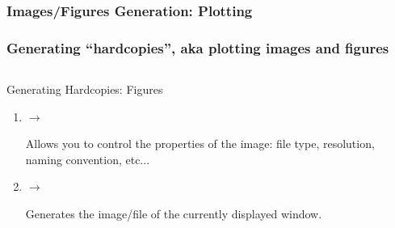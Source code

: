 \subsubsection{Images/Figures Generation: Plotting}
\begin{frame}
\frametitle{Generating ``hardcopies'', aka plotting images and figures}
\vspace{-2.5mm}
\begin{columns}
\begin{column}{5.75cm}
        \begin{block}{Generating Hardcopies: Figures}
        \begin{enumerate}

	\item
        \textcolor{DarkBlue}{}
         $\rightarrow$ 

	Allows you to control the properties of the image: file type, resolution, naming convention, etc...

	\item
	\textcolor{DarkBlue}{}
         $\rightarrow$ 

	Generates the image/file of the currently displayed window.


\end{enumerate}
\end{block}
\end{column}
\end{columns}
\end{frame}
